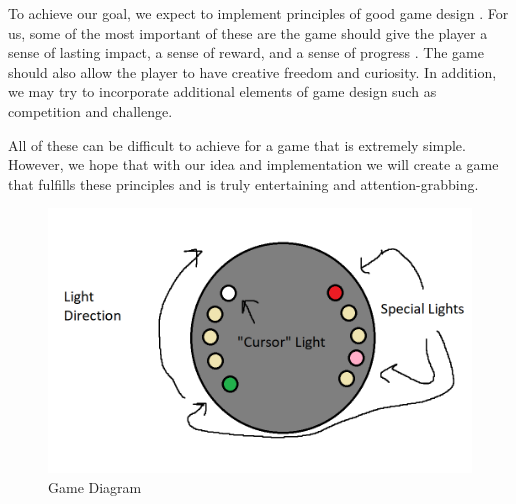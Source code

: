 \documentclass[12pt]{article}
\begin{document}
To achieve our goal, we expect to implement principles of good game design \cite{designPrinciples}. For us, some of the most important of these are the game should give the player a sense of lasting impact, a sense of reward, and a sense of progress \cite{youtube}. The game should also allow the player to have creative freedom and curiosity. In addition, we may try to incorporate additional elements of game design such as competition and challenge.

All of these can be difficult to achieve for a game that is extremely simple. However, we hope that with our idea and implementation we will create a game that fulfills these principles and is truly entertaining and attention-grabbing.



\begin{figure}[!t]
\centering
\includegraphics[width=4.5in]{Game_Diagram.png}
\caption{Game Diagram}
\label{fig:cpx}
\end{figure}
\end{document}
